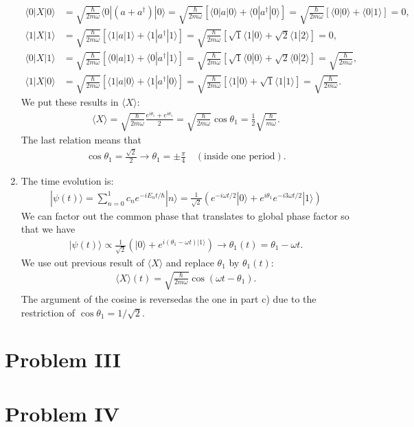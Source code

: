 \documentclass[letterpaper,11pt,twoside]{article}
\newcommand{\ket}[1]{|#1\rangle}
\newcommand{\braket}[1]{\langle#1\rangle}
\begin{document}
\begin{enumerate}
\begin{align*}
    \braket{0|X|0}&=\sqrt{\frac{\hbar}{2m\omega}}\braket{0|(a+a^\dagger)|0}=\sqrt{\frac{\hbar}{2m\omega}}\left[\braket{0|a|0}+\braket{0|a^\dagger|0}\right]=\sqrt{\frac{\hbar}{2m\omega}}\left[\braket{0|0}+\braket{0|1}\right]=0,\\
    \braket{1|X|1}&=\sqrt{\frac{\hbar}{2m\omega}}\left[\braket{1|a|1}+\braket{1|a^\dagger|1}\right]=\sqrt{\frac{\hbar}{2m\omega}}\left[\sqrt{1}\braket{1|0}+\sqrt{2}\braket{1|2}\right]=0,\\
    \braket{0|X|1}&=\sqrt{\frac{\hbar}{2m\omega}}\left[\braket{0|a|1}+\braket{0|a^\dagger|1}\right]=\sqrt{\frac{\hbar}{2m\omega}}\left[\sqrt{1}\braket{0|0}+\sqrt{2}\braket{0|2}\right]=\sqrt{\frac{\hbar}{2m\omega}},\\
    \braket{1|X|0}&=\sqrt{\frac{\hbar}{2m\omega}}\left[\braket{1|a|0}+\braket{1|a^\dagger|0}\right]=\sqrt{\frac{\hbar}{2m\omega}}\left[\braket{1|0}+\sqrt{1}\braket{1|1}\right]=\sqrt{\frac{\hbar}{2m\omega}}.
  \end{align*}
  We put these results in $\braket{X}$:
  \begin{align*}
    \braket{X}=\sqrt{\frac{\hbar}{2m\omega}}\frac{e^{i\theta_1}+e^{i\theta_1}}{2}=\sqrt{\frac{\hbar}{2m\omega}}\cos\theta_1=\frac{1}{2}\sqrt{\frac{\hbar}{m\omega}}.
  \end{align*}
  The last relation means that 
  \begin{align*}
    \cos\theta_1=\frac{\sqrt{2}}{2}\longrightarrow \theta_1=\pm\frac{\pi}{4}\quad(\text{inside one period}).
  \end{align*}
  \item The time evolution is:
  \begin{align*}
    \ket{\psi(t)}=\sum_{n=0}^1c_ne^{-iE_nt/\hbar}\ket{n}=\frac{1}{\sqrt{2}}\left(e^{-i\omega t/2}\ket{0}+e^{i\theta_1}e^{-i3\omega t/2}\ket{1}\right)
  \end{align*}
  We can factor out the common phase that translates to global phase factor so that we have
  \begin{align*}
    \ket{\psi(t)}\propto\frac{1}{\sqrt{2}}\left(\ket{0}+e^{i(\theta_1-\omega t)\ket{1}}\right)\longrightarrow\theta_1(t)=\theta_1-\omega t.
  \end{align*}
  We use out previous result of $\braket{X}$ and replace $\theta_1$ by $\theta_1(t)$:
  \begin{align*}
    \braket{X}(t)=\sqrt{\frac{\hbar}{2m\omega}}\cos(\omega t-\theta_1).
  \end{align*}
  The argument of the cosine is reversedas the one in part c) due to the restriction of $\cos\theta_1=1/\sqrt{2}$.


\end{enumerate}


\section*{Problem III}


\section*{Problem IV}

%
\end{document}
